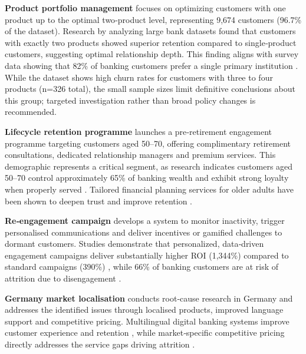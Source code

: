 \documentclass[12pt]{article}
\begin{document}
\textbf{Product portfolio management} focuses on optimizing customers with one product up to the optimal two‑product level, representing 9,674 customers (96.7\% of the dataset).  Research by \citet{singh2024productchurn} analyzing large bank datasets found that customers with exactly two products showed superior retention compared to single‑product customers, suggesting optimal relationship depth.  This finding aligns with survey data showing that 82\% of banking customers prefer a single primary institution \citep{smith2025switching}.  While the dataset shows high churn rates for customers with three to four products (n=326 total), the small sample sizes limit definitive conclusions about this group; targeted investigation rather than broad policy changes is recommended.

\textbf{Lifecycle retention programme} launches a pre‑retirement engagement programme targeting customers aged 50–70, offering complimentary retirement consultations, dedicated relationship managers and premium services.  This demographic represents a critical segment, as research indicates customers aged 50–70 control approximately 65\% of banking wealth and exhibit strong loyalty when properly served \citep{marr2024aging}.  Tailored financial planning services for older adults have been shown to deepen trust and improve retention \citep{ncrc2021agefriendly}.

\textbf{Re‑engagement campaign} develops a system to monitor inactivity, trigger personalised communications and deliver incentives or gamified challenges to dormant customers.  Studies demonstrate that personalized, data‑driven engagement campaigns deliver substantially higher ROI (1,344\%) compared to standard campaigns (390\%) \citep{cline2024churn}, while 66\% of banking customers are at risk of attrition due to disengagement \citep{cornerstone2025dormant}.

\textbf{Germany market localisation} conducts root‑cause research in Germany and addresses the identified issues through localised products, improved language support and competitive pricing.  Multilingual digital banking systems improve customer experience and retention \citep{hunsicker2023multilingual}, while market‑specific competitive pricing directly addresses the service gaps driving attrition \citep{smith2025switching}.
\end{document}
